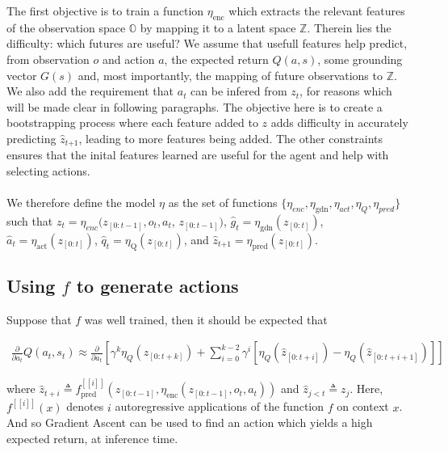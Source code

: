 \documentclass[]{article}
\begin{document}
The first objective is to train a function $\eta_{\text{enc}}$ which extracts the relevant features of the observation space $\mathbb{O}$ by mapping it to a latent space $\mathbb{Z}$. Therein lies the difficulty: which futures are useful?
We assume that usefull features help predict, from observation $o$ and action $a$, the expected return $Q(a, s)$, some grounding vector $G(s)$ and, most importantly, the mapping of future observations to $\mathbb{Z}$. We also add the requirement that $a_t$ can be infered from $z_t$, for reasons which will be made clear in following paragraphs. The objective here is to create a bootstrapping process where each feature added to $z$ adds difficulty in accurately predicting $\hat{z}_{t \boldsymbol{+}1}$, leading to more features being added. The other constraints ensures that the inital features learned are useful for the agent and help with selecting actions.
\\ \\ 
We therefore define the model $\eta$ as the set of functions $\{\eta_{enc}, \eta_{\text{gdn}}, \eta_{act}, \eta_{Q}, \eta_{pred}\}$ such that $z_t = \eta_{enc}(z_{[0:t-1]}, o_t, a_t$, $z_{[0:t-1]})$, $\hat{g}_t = \eta_{\text{gdn}}(z_{[0:t]})$, $\hat{a}_t = \eta_{\text{act}}(z_{[0:t]})$, $\hat{q}_t = \eta_{\text{Q}}(z_{[0:t]})$, and $\hat{z}_{t \boldsymbol{+}1} = \eta_{\text{pred}}(z_{[0:t]})$. 



\subsection{Using $f$ to generate actions}

Suppose that $f$ was well trained, then it should be expected that


\begin{align}
\frac{\partial}{\partial a_t}Q(a_t, s_t)
\approx
\frac{\partial}{\partial a_t} \left[ 
	\gamma^{k}\eta_{Q}(\hat{z}_{[0:t+k]}) + \sum_{i=0}^{k-2} \gamma^{i}\left[\eta_{Q}(\hat{z}_{[0:t+i]}) -\eta_{Q}(\hat{z}_{[0:t+i+1]})\right]
\right]
\end{align}


where 
$
\hat{z}_{t+i} \triangleq f^{[[i]] }_{\text{pred}}(z_{[0:t-1]}, \eta_{\text{enc}}(z_{[0:t-1]}, o_t, a_t)) 
$
and
$
\hat{z}_{j<t} \triangleq z_j
$. Here, $f^{[[i]]}(x)$ denotes $i$ autoregressive applications of the function $f$ on context $x$. And so Gradient Ascent can be used to find an action which yields a high expected return, at inference time.
\end{document}
